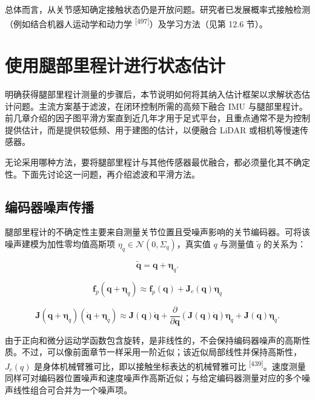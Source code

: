 总体而言，从关节感知确定接触状态仍是开放问题。研究者已发展概率式接触检测（例如结合机器人运动学和动力学 \textsuperscript{[497]}）及学习方法（见第 12.6 节）。

\section{使用腿部里程计进行状态估计}

明确获得腿部里程计测量的步骤后，本节说明如何将其纳入估计框架以求解状态估计问题。主流方案基于滤波，在闭环控制所需的高频下融合 IMU 与腿部里程计。前几章介绍的因子图平滑方案直到近几年才用于足式平台，且重点通常不是为控制提供估计，而是提供较低频、用于建图的估计，以便融合 LiDAR 或相机等慢速传感器。

无论采用哪种方法，要将腿部里程计与其他传感器最优融合，都必须量化其不确定性。下面先讨论这一问题，再介绍滤波和平滑方法。

\subsection{编码器噪声传播}

腿部里程计的不确定性主要来自测量关节位置且受噪声影响的关节编码器。可将该噪声建模为加性零均值高斯项 $\eta_q\in\mathcal{N}(0,\Sigma_q)$，真实值 $q$ 与测量值 $\tilde q$ 的关系为：

\begin{equation}
\tilde {\boldsymbol {q}} = \boldsymbol {q} + \boldsymbol {\eta} _ {q}.\tag{12.26}
\end{equation}

\begin{equation}
\mathbf {f} _ {p} (\boldsymbol {q} + \boldsymbol {\eta} _ {q}) \approx \mathbf {f} _ {p} (\boldsymbol {q}) + \boldsymbol {J} _ {c} (\boldsymbol {q}) \boldsymbol {\eta} _ {q}\tag{12.27}
\end{equation}

\begin{equation}
\boldsymbol {J} (\boldsymbol {q} + \boldsymbol {\eta} _ {q}) (\dot {\boldsymbol {q}} + \boldsymbol {\eta} _ {\dot {q}}) \approx \boldsymbol {J} (\boldsymbol {q}) \dot {\boldsymbol {q}} + \frac {\partial}{\partial \boldsymbol {q}} (\boldsymbol {J} (\boldsymbol {q}) \dot {\boldsymbol {q}}) \boldsymbol {\eta} _ {q} + \boldsymbol {J} (\boldsymbol {q}) \boldsymbol {\eta} _ {\dot {q}}.\tag{12.28}
\end{equation}

由于正向和微分运动学函数包含旋转，是非线性的，不会保持编码器噪声的高斯性质。不过，可以像前面章节一样采用一阶近似；该近似局部线性并保持高斯性，$J_c(q)$ 是身体机械臂雅可比，即以接触坐标表达的机械臂雅可比 \textsuperscript{[439]}。速度测量同样可对编码器位置噪声和速度噪声作高斯近似；与给定编码器测量对应的多个噪声线性组合可合并为一个噪声项。

